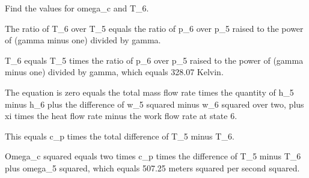 Find the values for omega_c and T_6.

The ratio of T_6 over T_5 equals the ratio of p_6 over p_5 raised to the power of (gamma minus one) divided by gamma.

T_6 equals T_5 times the ratio of p_6 over p_5 raised to the power of (gamma minus one) divided by gamma, which equals 328.07 Kelvin.

The equation is zero equals the total mass flow rate times the quantity of h_5 minus h_6 plus the difference of w_5 squared minus w_6 squared over two, plus xi times the heat flow rate minus the work flow rate at state 6.

This equals c_p times the total difference of T_5 minus T_6.

Omega_c squared equals two times c_p times the difference of T_5 minus T_6 plus omega_5 squared, which equals 507.25 meters squared per second squared.
